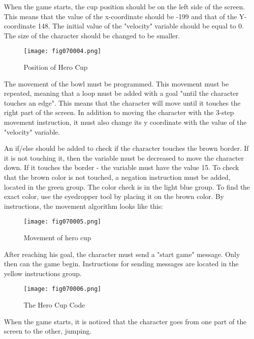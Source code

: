 When the game starts, the cup position should be on the left side of the screen. This means that the value of the x-coordinate should be -199 and that of the Y-coordinate 148. The initial value of the "velocity" variable should be equal to 0. The size of the character should be changed to be smaller.

\begin{figure}[H]
   \centering
   \texttt{[image: fig070004.png]}
   \caption{Position of Hero Cup}
\label{fig070004}
\end{figure}

The movement of the bowl must be programmed. This movement must be repeated, meaning that a loop must be added with a goal "until the character touches an edge". This means that the character will move until it touches the right part of the screen. In addition to moving the character with the 3-step movement instruction, it must also change its y coordinate with the value of the "velocity" variable.

An if/else should be added to check if the character touches the brown border. If it is not touching it, then the variable must be decreased to move the character down. If it touches the border - the variable must have the value 15. To check that the brown color is not touched, a negation instruction must be added, located in the green group. The color check is in the light blue group. To find the exact color, use the eyedropper tool by placing it on the brown color. By instructions, the movement algorithm looks like this:

\begin{figure}[H]
   \centering
   \texttt{[image: fig070005.png]}
   \caption{Movement of hero cup}
\label{fig070005}
\end{figure}

After reaching his goal, the character must send a "start game" message. Only then can the game begin. Instructions for sending messages are located in the yellow instructions group.

\begin{figure}[H]
   \centering
   \texttt{[image: fig070006.png]}
   \caption{The Hero Cup Code}
\label{fig070006}
\end{figure}

When the game starts, it is noticed that the character goes from one part of the screen to the other, jumping.

